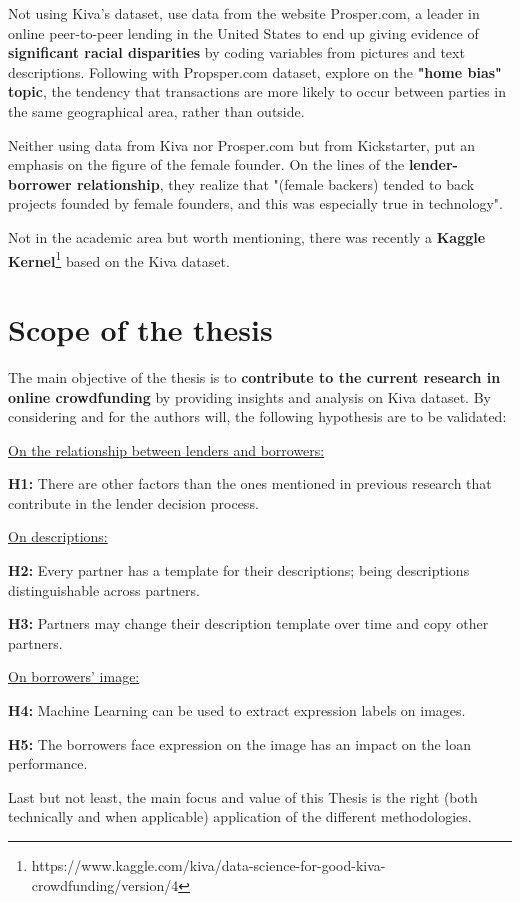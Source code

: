 Not using Kiva's dataset, \textcite{Pope2011} use data from the website Prosper.com, a leader in online peer-to-peer lending in the United States to end up giving evidence of \textbf{significant racial disparities} by coding variables from pictures and text descriptions. Following with Propsper.com dataset, \textcite{Lin2013} explore on the \textbf{"home bias" topic}, the tendency that transactions are more likely to occur between parties in the same geographical area, rather than outside. \par

Neither using data from Kiva nor Prosper.com but from Kickstarter, \textcite{Greenberg2015} put an emphasis on the figure of the female founder. On the lines of the \textbf{lender-borrower relationship}, they realize that "(female backers) tended to back projects founded by female founders, and this was especially true in technology".

Not in the academic area but worth mentioning, there was recently a \textbf{Kaggle Kernel}\footnote{https://www.kaggle.com/kiva/data-science-for-good-kiva-crowdfunding/version/4} based on the Kiva dataset.
\newpage
\section{Scope of the thesis}
The main objective of the thesis is to \textbf{contribute to the current research in online crowdfunding} by providing insights and analysis on Kiva dataset.
By considering \textcite{Moleskis2018} and for the authors will, the following hypothesis are to be validated:

\underline{On the relationship between lenders and borrowers:}
\begin{tcolorbox}
\textbf{H1:} There are other factors than the ones mentioned in previous research that contribute in the lender decision process.
\end{tcolorbox}

\underline{On descriptions:}
\begin{tcolorbox}
\textbf{H2:} Every partner has a template for their descriptions; being descriptions distinguishable across partners.
\end{tcolorbox}
\begin{tcolorbox}
\textbf{H3:} Partners may change their description template over time and copy other partners.
\end{tcolorbox}

\underline{On borrowers' image:}
\begin{tcolorbox}
\textbf{H4:} Machine Learning can be used to extract expression labels on images.
\end{tcolorbox}

\begin{tcolorbox}
\textbf{H5:} The borrowers face expression on the image has an impact on the loan performance.
\end{tcolorbox}

Last but not least, the main focus and value of this Thesis is the right (both technically and when applicable) application of the different methodologies.